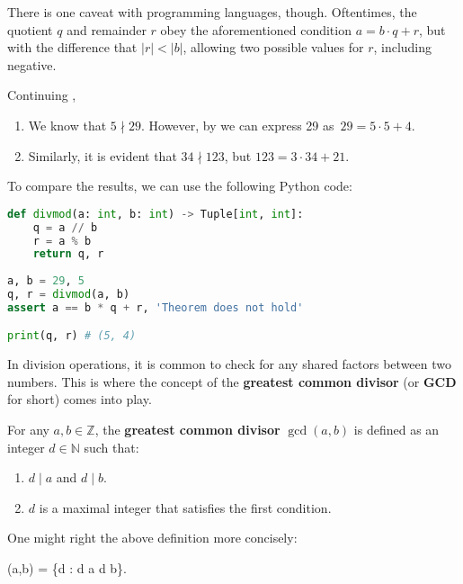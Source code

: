 \documentclass[../lecture-notes-148x210.tex]{subfiles}
\begin{document}
\begin{remark}
    There is one caveat with programming languages, though. Oftentimes, the
    quotient $q$ and remainder $r$ obey the aforementioned condition $a=b\cdot q+r$,
    but with the difference that $|r| < |b|$, allowing two possible values for $r$,
    including negative. 
\end{remark}

\begin{example} \label{example:divisibility_2}
    Continuing , \hfill
    \begin{enumerate}
        \item We know that $5 \nmid 29$. However, by  we can express 29 
        as~$29 = 5 \cdot 5 + 4$.
        \item Similarly, it is evident that $34 \nmid 123$, but $123 = 3 \cdot 34 + 21$.
    \end{enumerate}

    To compare the results, we can use the following Python code:
    \begin{lstlisting}[language=Python, numbers=none]
def divmod(a: int, b: int) -> Tuple[int, int]:
    q = a // b
    r = a % b
    return q, r
    
a, b = 29, 5
q, r = divmod(a, b)
assert a == b * q + r, 'Theorem does not hold'

print(q, r) # (5, 4)
\end{lstlisting}
\end{example}

In division operations, it is common to check for any shared factors between two
numbers. This is where the concept of the \textbf{greatest common divisor} (or
\textbf{GCD} for short) comes into play.

\begin{definition}[GCD]
    For any $a, b \in \mathbb{Z}$, the \textbf{greatest common divisor} \cite{Ben_Lynn_1980} $\gcd(a, b)$ is defined as an integer $d \in \mathbb{N}$ such that:
    \begin{enumerate}
        \item $d \mid a$ and $d \mid b$.
        \item $d$ is a maximal integer that satisfies the first condition.
    \end{enumerate}

    One might right the above definition more concisely:
    \begin{xequation}
        \gcd(a,b) = \max\{d \in {}: d \mid a \;  \; d \mid b\}.
    \end{xequation}
\end{definition}
\end{document}
